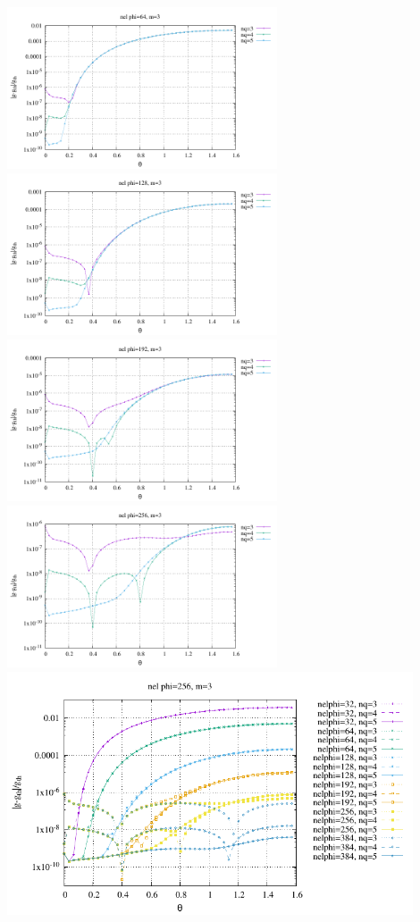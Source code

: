\begin{center}
\includegraphics[width=8cm]{python_codes/fieldstone_152/RESULTS/exp1/gravity/nelr32/gravity_64nq.pdf}
\includegraphics[width=8cm]{python_codes/fieldstone_152/RESULTS/exp1/gravity/nelr32/gravity_128nq.pdf}
\includegraphics[width=8cm]{python_codes/fieldstone_152/RESULTS/exp1/gravity/nelr32/gravity_192nq.pdf}
\includegraphics[width=8cm]{python_codes/fieldstone_152/RESULTS/exp1/gravity/nelr32/gravity_256nq.pdf}\\
\includegraphics[width=12cm]{python_codes/fieldstone_152/RESULTS/exp1/gravity/nelr32/gravity_error.pdf}
\end{center}

